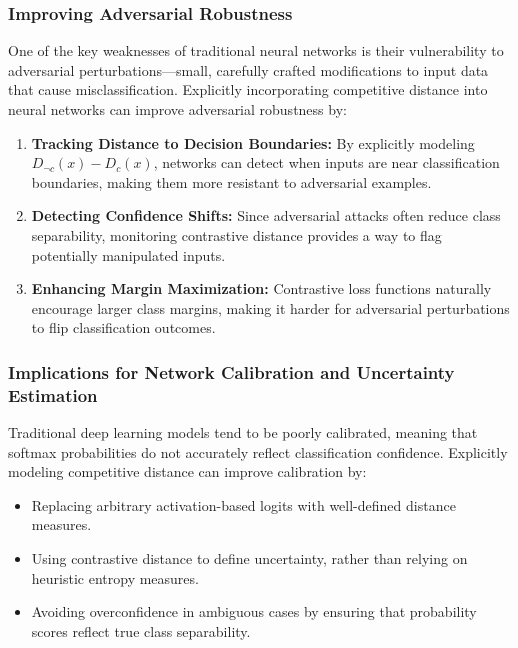 \documentclass[12pt]{article}
\begin{document}
\subsubsection{Improving Adversarial Robustness}

One of the key weaknesses of traditional neural networks is their vulnerability to adversarial perturbations—small, carefully crafted modifications to input data that cause misclassification. Explicitly incorporating competitive distance into neural networks can improve adversarial robustness by:

\begin{enumerate}
    \item \textbf{Tracking Distance to Decision Boundaries:} By explicitly modeling \( D_{\neg c}(x) - D_c(x) \), networks can detect when inputs are near classification boundaries, making them more resistant to adversarial examples.
    \item \textbf{Detecting Confidence Shifts:} Since adversarial attacks often reduce class separability, monitoring contrastive distance provides a way to flag potentially manipulated inputs.
    \item \textbf{Enhancing Margin Maximization:} Contrastive loss functions naturally encourage larger class margins, making it harder for adversarial perturbations to flip classification outcomes.
\end{enumerate}

\subsubsection{Implications for Network Calibration and Uncertainty Estimation}

Traditional deep learning models tend to be poorly calibrated, meaning that softmax probabilities do not accurately reflect classification confidence. Explicitly modeling competitive distance can improve calibration by:

\begin{itemize}
    \item Replacing arbitrary activation-based logits with well-defined distance measures.
    \item Using contrastive distance to define uncertainty, rather than relying on heuristic entropy measures.
    \item Avoiding overconfidence in ambiguous cases by ensuring that probability scores reflect true class separability.
\end{itemize}
\end{document}
